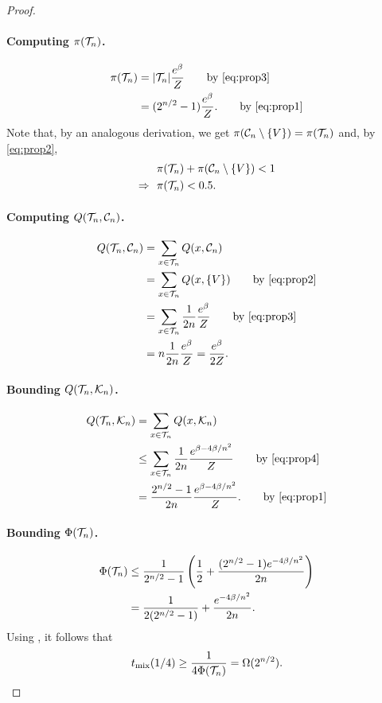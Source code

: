 \begin{proof}
\paragraph{Computing $\pi(\mathcal{T}_n)$.}
\begin{align*}
  \pi(\htn) &= |\htn| \frac{e^{\beta}}{Z} \tag*{by \eqref{eq:prop3}} \\
         &= (2^{n/2} - 1) \frac{e^{\beta}}{Z}. \tag*{by \eqref{eq:prop1}}
\end{align*}
Note that, by an analogous derivation, we get $\pi(\mathcal{C}_n \setminus \{V\}) = \pi(\mathcal{T}_n)$ and, by \eqref{eq:prop2},
\begin{align*}
  &\pi(\mathcal{T}_n) + \pi(\mathcal{C}_n \setminus \{V\}) < 1 \\
  \Rightarrow\ \ &\pi(\mathcal{T}_n) < 0.5.
\end{align*}
  
\paragraph{Computing $Q(\mathcal{T}_n, \mathcal{C}_n)$.}
\begin{align*}
  Q(\htn, \hcn) &= \sum_{x \in \htn} Q(x, \hcn) \\
                &= \sum_{x \in \htn} Q(x, \{V\}) \tag*{by \eqref{eq:prop2}} \\
                &= \sum_{x \in \htn} \frac{1}{2n} \frac{e^{\beta}}{Z} \tag*{by \eqref{eq:prop3}} \\
                &= n \frac{1}{2n} \frac{e^{\beta}}{Z} = \frac{e^{\beta}}{2Z}.
\end{align*}
    
\paragraph{Bounding $Q(\mathcal{T}_n, \mathcal{K}_n)$.}
\begin{align*}
  Q(\htn, \hkn) &= \sum_{x \in \htn} Q(x, \hkn) \\
                &\leq \sum_{x \in \htn} \frac{1}{2n} \frac{e^{\beta - 4\beta/n^2}}{Z} \tag*{by \eqref{eq:prop4}} \\
                &= \frac{2^{n/2} - 1}{2n} \frac{e^{\beta - 4\beta/n^2}}{Z}. \tag*{by \eqref{eq:prop1}}
\end{align*}

\paragraph{Bounding $\Phi(\mathcal{T}_n)$.}
\begin{align*}
  \Phi(\mathcal{T}_n) &\leq \frac{1}{2^{n/2} - 1}\left(\frac{1}{2} + \frac{(2^{n/2} - 1) e^{-4\beta/n^2}}{2n}\right)\\
          &= \frac{1}{2(2^{n/2} - 1)} + \frac{e^{-4\beta/n^2}}{2n}.
\end{align*}
Using \citep[Theorem 7.3]{levin08book}, it follows that
\begin{align*}
  t_{\mathrm{mix}}(1/4) \geq \frac{1}{4\Phi(\mathcal{T}_n)} = \Omega(2^{n/2}).
\end{align*}

\end{proof}

